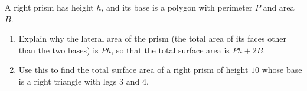 A right prism has height $h$, and its base is a polygon with perimeter $P$ and area $B$.
\begin{enumerate}
\item[(a)] Explain why the lateral area of the prism (the total area of its faces other than the two bases) is $Ph$, so that the total surface area is $Ph+2B$.
\item[(b)] Use this to find the total surface area of a right prism of height $10$ whose base is a right triangle with legs $3$ and $4$.
\end{enumerate}
